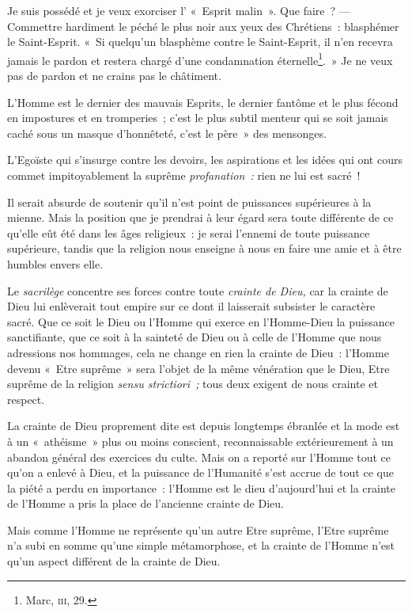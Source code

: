\documentclass[french,twoside]{book} %
\begin{document}
Je suis possédé et je veux exorciser l’ « Esprit malin ». Que faire ? — Commettre hardiment le péché le plus noir aux yeux des Chrétiens : blasphémer le Saint-Esprit. « Si quelqu’un blasphème contre le Saint-Esprit, il n’en recevra jamais le pardon et restera chargé d’une condamnation éternelle\footnote{ \noindent Marc, {\scshape iii}, 29.
 }. » Je ne veux pas de pardon et ne crains pas le châtiment.\par
L’Homme est le dernier des mauvais Esprits, le dernier fantôme et le plus fécond en impostures et en tromperies ; c’est le plus subtil menteur qui se soit jamais caché sous un masque d’honnêteté, c’est le père » des mensonges.\par
L’Egoïste qui s’insurge contre les devoirs, les aspirations et les idées qui ont cours commet impitoyablement la suprême \emph{profanation :} rien ne lui est sacré !\par
Il serait absurde de soutenir qu’il n’est point de puissances supérieures à la mienne. Mais la position que je prendrai à leur égard sera toute différente de ce qu’elle eût été dans les âges religieux : je serai l’ennemi de toute puissance supérieure, tandis que la religion nous enseigne à nous en faire une amie et à être humbles envers elle.\par
Le \emph{sacrilège} concentre ses forces contre toute \emph{crainte  de Dieu,} car la crainte de Dieu lui enlèverait tout empire sur ce dont il laisserait subsister le caractère sacré. Que ce soit le Dieu ou l’Homme qui exerce en l’Homme-Dieu la puissance sanctifiante, que ce soit à la sainteté de Dieu ou à celle de l’Homme que nous adressions nos hommages, cela ne change en rien la crainte de Dieu : l’Homme devenu « Etre suprême » sera l’objet de la même vénération que le Dieu, Etre suprême de la religion \emph{sensu strictiori ;} tous deux exigent de nous crainte et respect.\par
La crainte de Dieu proprement dite est depuis longtemps ébranlée et la mode est à un « athéisme » plus ou moins conscient, reconnaissable extérieurement à un abandon général des exercices du culte. Mais on a reporté sur l’Homme tout ce qu’on a enlevé à Dieu, et la puissance de l’Humanité s’est accrue de tout ce que la piété a perdu en importance : l’Homme est le dieu d’aujourd’hui et la crainte de l’Homme a pris la place de l’ancienne crainte de Dieu.\par
Mais comme l’Homme ne représente qu’un autre Etre suprême, l’Etre suprême n’a subi en somme qu’une simple métamorphose, et la crainte de l’Homme n’est qu’un aspect différent de la crainte de Dieu.\par
\end{document}
